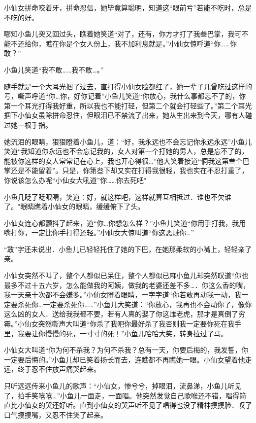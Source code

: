 \documentclass[12pt,oneside]{book}
\begin{document}
小仙女拼命咬着牙，拼命忍信，她毕竟算聪明，知道这``眼前亏''若能不吃时，总是不吃的好。

哪知小鱼儿突又回过头，瞧着她笑道``对了，还有，你方才打了我叁巴掌，我可不能不还给你，瞧在你是个女人份上，我不加利息就是。''小仙女惊呼道``你\ldots\ldots 你敢？''

小鱼儿笑道``我不敢\ldots\ldots 我不敢\ldots。''

随手就是一个大耳光掴了过去，直打得小仙女脸都红了，她一辈子几曾吃过这样的亏，嘶声呼道``你\ldots 你，好你记着''小鱼儿笑道``你放心，我什么事都忘不了的，你第一个耳光打得我好重，所以我也不能打轻，但第二个就会打轻些了。''第二个耳光掴下小仙女虽除拼命忍住，但眼泪已不禁流了出来，她从生出来到今天，哪有人碰过她一根手指。

她流泪的眼睛，狠狠瞪着小鱼儿，道：``好，我永远也不会忘记你永远永远''小鱼儿笑道``我知道你永远也不会忘记我的，女人对第一个打她的男人，总是忘不了的，能被你这样的女人常常记在心上，我也开心得很\ldots{}''他大笑着接道``侗我这第叁个巴掌还是不能留着''。只是，你第叁下却又实在打得我很轻，我也实在不忍打重了，你说该怎么办呢``小仙女大吼道''你\ldots\ldots 你去死吧"

小鱼几眨了眨眼睛，笑道：好，就这样吧，这样就算互相抵过．谁也不欠谁了。"眼睛瞧着小仙女的眼睛，缓缓俯下了头。

小仙女连心都颤抖了起来，道``你\ldots 你想怎么样？''小鱼儿笑道``你用手打我，我用嘴打你，一定比你手打得还轻。''小仙女大惊叫道``你这恶贼你\ldots{}''

``敢''字还未说出．小鱼儿已轻轻托住了她的下巴，在她那柔软的小嘴上，轻轻亲了亲。

小仙女突然不叫了，整个人都似已呆住，整个人都似已麻小鱼儿却突然叹道``你也最多不过十五六岁，怎么能做我的阿姨，做我的老婆还差不多\ldots．你这么香的嘴，我一天亲十次都不会嫌多。''小仙女瞪着眼睛，一字字道``你若敢再动我一动，我一定要杀死你\ldots 一定要杀死你\ldots\ldots{}''小鱼儿大笑道：``你放心，我再也不会动你了，像你这么凶的女人．送给我我都不要，若有人真的娶了你这雌老虎，那才是真倒了穷霉。''小仙女突然嘶声大叫道``你杀了我吧你最好杀了我否则我一定要你死在我手里，我要让你慢慢的死，一寸寸的死！''小鱼儿哈哈大笑，转身拉过了马。

小仙女大叫道``你为何不杀我？为何不杀我？总有一天，你要后梅的，我发誓，你一定要后悔的。''小鱼儿却已笑着扬长而去，连瞧都不再瞧她一眼。小仙女望着他走远，终于忍不住放声痛哭起来。

只听远远传来小鱼儿的歌声：``小仙女，惨兮兮，掉眼泪，流鼻涕，小鱼儿听见了，拍手笑嘻嘻\ldots{}''小鱼儿一面走，一面唱。他突然发觉自己歌喉还不错，唱得简直比小仙女的哭还好听。直到小仙女的哭声听不见了唱得也没了精神摸摸脸．叹了口气摸摸嘴，又忍不住笑了起来。
\end{document}

